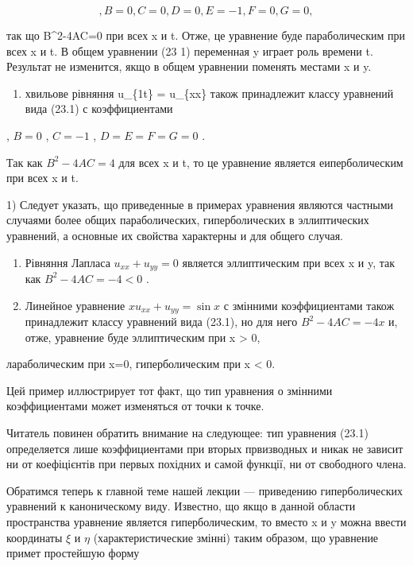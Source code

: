 \documentclass[
  ukrainian,
]{article}
\providecommand{\tightlist}{%
  \setlength{\itemsep}{0pt}\setlength{\parskip}{0pt}}
\begin{document}
\[
,  B=0  ,  C=0  ,  D=0  ,  E=-1  ,  F=0  ,  G=0  ,
\]

так що B\^{}2-4AC=0 при всех x и t. Отже, це уравнение буде
параболическим при всех x и t. В общем уравнении (23 1) переменная y
играет роль времени t. Результат не изменится, якщо в общем уравнении
поменять местами x и y.

\begin{enumerate}
\def\labelenumi{\arabic{enumi}.}
\setcounter{enumi}{1}
\tightlist
\item
  хвильове рівняння u\_\{1t\} = u\_\{xx\} також принадлежит классу
  уравнений вида (23.1) с коэффициентами
\end{enumerate}

, \(B=0\) , \(C=-1\) , \(D=E=F=G=0\) .

Так как \(B^2 - 4AC = 4\) для всех x и t, то це уравнение является
еиперболическим при всех x и t.

1) Следует указать, що приведенные в примерах уравнения являются
частными случаями более общих параболических, гиперболических в
эллиптических уравнений, а основные их свойства характерны и для общего
случая.

\begin{enumerate}
\def\labelenumi{\arabic{enumi}.}
\setcounter{enumi}{2}
\item
  Рівняння Лапласа \(u_{xx} + u_{yy} = 0\) является эллиптическим при
  всех x и y, так как \(B^2 - 4AC = - 4 < 0\) .
\item
  Линейное уравнение \(xu_{xx} + u_{yy} = \sin x\) с змінними
  коэффициентами також принадлежит классу уравнений вида (23.1), но для
  него \(B^2-4AC=-4x\) и, отже, уравнение буде эллиптическим при x
  \textgreater{} 0,
\end{enumerate}

лараболическим при x=0, гиперболическим при x \textless{} 0.

Цей пример иллюстрирует тот факт, що тип уравнения о змінними
коэффициентами может изменяться от точки к точке.

Читатель повинен обратить внимание на следующее: тип уравнения (23.1)
определяется лише коэффициентами при вторых првизводных и никак не
зависит ни от коефіцієнтів при первых похідних и самой функції, ни от
свободного члена.

Обратимся теперь к главной теме нашей лекции --- приведению
гиперболических уравнений к каноническому виду. Известно, що якщо в
данной области пространства уравнение является гиперболическим, то
вместо x и y можна ввести координаты \(\xi\) и \(\eta\)
(характеристические змінні) таким образом, що уравнение примет
простейшую форму
\end{document}

